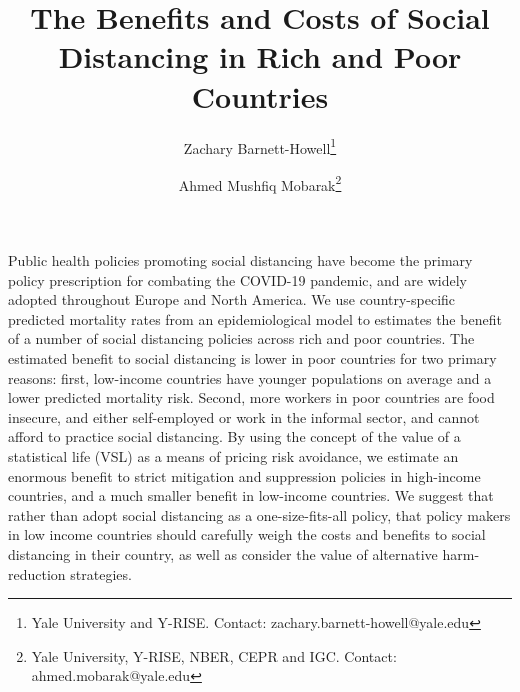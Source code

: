 \documentclass[11pt]{article}
\author{Zachary Barnett-Howell\thanks{Yale University and Y-RISE. Contact: zachary.barnett-howell@yale.edu} \and Ahmed Mushfiq Mobarak\thanks{Yale University, Y-RISE, NBER, CEPR and IGC. Contact: ahmed.mobarak@yale.edu} }
\title{The Benefits and Costs of Social Distancing in Rich and Poor Countries}
\begin{document}
\maketitle

\begin{abstract}

\end{abstract}



Public health policies promoting social distancing have become the primary policy prescription for combating the COVID-19 pandemic, and are widely adopted throughout Europe and North America. We use country-specific predicted mortality rates from an epidemiological model to estimates the benefit of a number of social distancing policies across rich and poor countries. The estimated benefit to social distancing is lower in poor countries for two primary reasons: first, low-income countries have younger populations on average and a lower predicted mortality risk. Second, more workers in poor countries are food insecure, and either self-employed or work in the informal sector, and cannot afford to practice social distancing. By using the concept of the value of a statistical life (VSL) as a means of pricing risk avoidance, we estimate an enormous benefit to strict mitigation and suppression policies in high-income countries, and a much smaller benefit in low-income countries. We suggest that rather than adopt social distancing as a one-size-fits-all policy, that policy makers in low income countries should carefully weigh the costs and benefits to social distancing in their country, as well as consider the value of alternative harm-reduction strategies.
\end{document}
